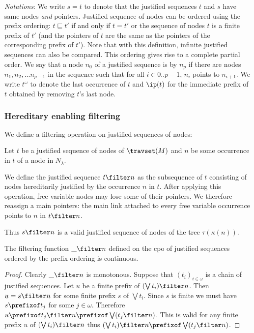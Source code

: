 \emph{Notations}: We write $s = t$ to denote that the justified sequences $t$ and $s$
have same nodes \emph{and} pointers. Justified sequence of nodes can
be ordered using the prefix ordering: $t \sqsubseteq t'$ if and only
if $t=t'$ or the sequence of nodes $t$ is a finite prefix of $t'$
(and the pointers of $t$ are the same as the pointers of the
corresponding prefix of $t'$). Note that with this definition,
infinite justified sequences can also be compared. This ordering
gives rise to a complete partial order.
We say that a node $n_0$ of a justified sequence is  by $n_p$ if there are nodes $n_1, n_2, \ldots n_{p-1}$ in the sequence such that for all $i\in 0..p-1$, $n_i$ points to $n_{i+1}$.
We write $t^\omega$ to denote the last occurrence of $t$ and $\ip(t)$ for the immediate prefix of $t$ obtained by removing $t$'s last node.
\smallskip

\subsubsection{Hereditary enabling filtering}

We define a filtering operation on justified sequences of nodes:
\begin{definition}
Let $t$ be a justified sequence of nodes of $\travset(M)$ and
$n$ be some occurrence in $t$ of a node in $N_\lambda$.

We define the justified sequence $t \filter n$ as the subsequence of $t$ consisting of nodes hereditarily justified by the occurrence $n$ in $t$.
After applying this operation, free-variable nodes may lose some of their pointers. We therefore reassign a main pointers: the main link attached to every free variable occurrence points to $n$ in $t\filter n$.
\end{definition}
Thus $s \filter n$ is a valid justified sequence of nodes of the tree $\tau(\kappa(n))$.

\begin{lemma}
\label{lem:filtercontinous}
The filtering function $\_ \filter n$ defined on the cpo of justified sequences ordered by the prefix ordering is continuous.
\end{lemma}
\begin{proof}
Clearly $\_ \filter n$ is monotonous.
Suppose that $(t_i)_{i\in\omega}$ is a chain of justified sequences. Let $u$ be a finite prefix of $(\bigvee t_i) \filter n$.
Then $u = s \filter n$ for some finite prefix $s$ of $\bigvee t_i$. Since $s$ is finite we must have $s \prefixof t_j$ for some $j\in\omega$.
Therefore $u \prefixof t_j \filter n \prefixof \bigvee (t_j \filter  n)$.
This is valid for any finite prefix $u$ of $(\bigvee t_i) \filter n$ thus $(\bigvee t_i) \filter  n \prefixof \bigvee (t_j \filter n)$.
\end{proof}

